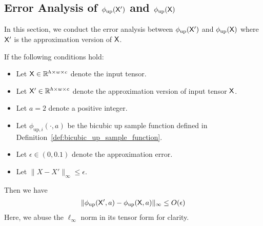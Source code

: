 \subsection{Error Analysis of \texorpdfstring{$\phi_{\mathrm{up}}(\mathsf{X}')$}{} and \texorpdfstring{$\phi_{\mathrm{up}}(\mathsf{X})$}{}}\label{sec:error_analysis_of_phi_x_prime_phi_x}
In this section, we conduct the error analysis between $\phi_{\mathrm{up}}(\mathsf{X}')$ and $\phi_{\mathrm{up}}(\mathsf{X})$ where $\mathsf{X}'$ is the approximation version of $\mathsf{X}$.
\begin{lemma}\label{lem:error_analysis_up_layer}
If the following conditions hold:
\begin{itemize}
    \item Let $\mathsf{X} \in \mathbb{R}^{h \times w \times c}$ denote the input tensor.
    \item Let $\mathsf{X}' \in \mathbb{R}^{h \times w \times c}$ denote the approximation version of input tensor $\mathsf{X}$.
    \item Let $a = 2$ denote a positive integer.
    \item Let $\phi_{\mathrm{up}, i}(\cdot, a)$ be the bicubic up sample function defined in Definition~\ref{def:bicubic_up_sample_function}.
    \item Let $\epsilon \in (0,0.1)$ denote the approximation error.
    \item Let $\|X-X'\|_\infty\leq \epsilon$.
\end{itemize}
Then we have
\begin{align*}
    \| \phi_{\rm up}(\mathsf{X}',a) - \phi_{\rm up}(\mathsf{X},a) \|_\infty \leq O(\epsilon)
\end{align*}
Here, we abuse the $\ell_\infty$ norm in its tensor form for clarity.
\end{lemma}

